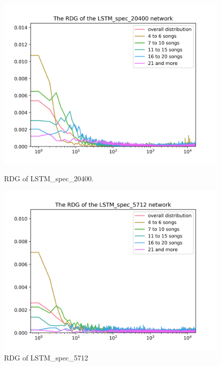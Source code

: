 \begin{figure}[h]
\centering
\begin{minipage}{.45\textwidth}
  \centering
  \includegraphics[width=1\linewidth]{./img/lstm_spec_20400_graph.png}
  \caption{RDG of LSTM\_spec\_20400.}
  \label{fig:lstm_spec_20400_distribution}
\end{minipage}
 \vspace{1cm}
\begin{minipage}{.45\textwidth}
  \centering
  \includegraphics[width=1\linewidth]{./img/lstm_spec_5712_graph.png}
  \caption{RDG of LSTM\_spec\_5712}
  \label{fig:lstm_spec_5712_distribution}
\end{minipage}
\end{figure}\label{fig:lstm_spec_distributions}

